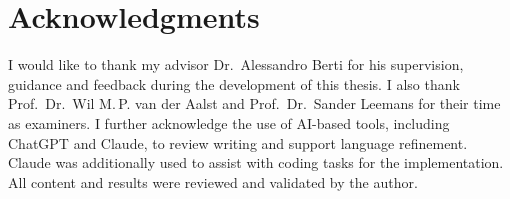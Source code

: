 \chapter*{Acknowledgments}

I would like to thank my advisor Dr.~Alessandro Berti for his supervision, guidance and feedback during the development of this thesis. I also thank Prof.~Dr.~Wil M.\,P. van der Aalst and Prof.~Dr.~Sander Leemans for their time as examiners.
I further acknowledge the use of AI-based tools, including ChatGPT and Claude, to review writing and support language refinement. Claude was additionally used to assist with coding tasks for the implementation. All content and results were reviewed and validated by the author.
